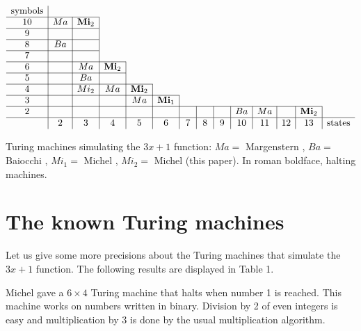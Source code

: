 \documentclass[10pt]{article}
\begin{document}
\begin{table}
$$\begin{array}{c|c|c|c|c|c|c|c|c|c|c|c|c|c}
\mbox{symbols} & \multicolumn{13}{c}{}\\                                                \cline{1-3}
10             & Ma    & \mbox{\bf Mi}_2& \multicolumn{11}{c}{}\\                       \cline{1-3}
9              &       &      &\multicolumn{11}{c}{}\\                                  \cline{1-3}
8              & Ba    &      &\multicolumn{11}{c}{}\\                                  \cline{1-3}
7              &       &      &\multicolumn{11}{c}{}\\                                  \cline{1-4}
6              &       & Ma   &  \mbox{\bf Mi}_2 & \multicolumn{10}{c}{}\\          \cline{1-4}
5              &       & Ba   &                  & \multicolumn{10}{c}{}\\          \cline{1-5}
4              &       & Mi_2 & Ma               &\mbox{\bf Mi}_2 & \multicolumn{9}{c}{}\\         \cline{1-6}
3              &       &      &                  & Ma   &\mbox{\bf Mi}_1 & \multicolumn{8}{c}{}\\  \cline{1-13}
2              &       &      &    &      &      &     &     &     & Ba  & Ma & & \mbox{\bf Mi}_2\\  \hline
               & 2     & 3    & 4  & 5    &\,6\, &\,7\,&\,8\,&\,9\,& 10  & 11 & 12 & 13 & \mbox{states}
\end{array}$$
\caption{Turing machines simulating the $3x + 1$ function:
$Ma=$ Margenstern \cite{Ma98,Ma00},
$Ba=$ Baiocchi \cite{Ba98},
$Mi_1=$ Michel \cite{Mi93},
$Mi_2=$ Michel (this paper).
In roman boldface, halting machines.}
\end{table}

\section{The known Turing machines}
Let us give some more precisions about the Turing machines that simulate
the $3x + 1$ function. The following results are displayed in Table 1.

Michel \cite{Mi93} gave a $6 \times 4$ Turing machine that halts when number 1 is reached.
This machine works on numbers written in binary. Division by 2 of even integers
is easy and multiplication by 3 is done by the usual multiplication algorithm.
\end{document}
